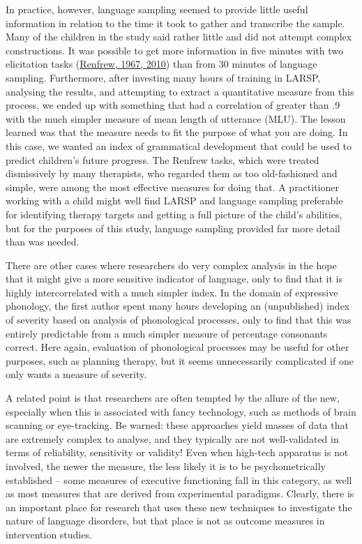 \documentclass{krantz}
\begin{document}
In practice, however, language sampling seemed to provide little useful information in relation to the time it took to gather and transcribe the sample. Many of the children in the study said rather little and did not attempt complex constructions. It was possible to get more information in five minutes with two elicitation tasks (\protect\hyperlink{ref-renfrew1967}{Renfrew, 1967, 2010}) than from 30 minutes of language sampling. Furthermore, after investing many hours of training in LARSP, analysing the results, and attempting to extract a quantitative measure from this process, we ended up with something that had a correlation of greater than .9 with the much simpler measure of mean length of utterance (MLU). The lesson learned was that the measure needs to fit the purpose of what you are doing. In this case, we wanted an index of grammatical development that could be used to predict children's future progress. The Renfrew tasks, which were treated dismissively by many therapists, who regarded them as too old-fashioned and simple, were among the most effective measures for doing that. A practitioner working with a child might well find LARSP and language sampling preferable for identifying therapy targets and getting a full picture of the child's abilities, but for the purposes of this study, language sampling provided far more detail than was needed.

There are other cases where researchers do very complex analysis in the hope that it might give a more sensitive indicator of language, only to find that it is highly intercorrelated with a much simpler index. In the domain of expressive phonology, the first author spent many hours developing an (unpublished) index of severity based on analysis of phonological processes, only to find that this was entirely predictable from a much simpler measure of percentage consonants correct. Here again, evaluation of phonological processes may be useful for other purposes, such as planning therapy, but it seems unnecessarily complicated if one only wants a measure of severity.

A related point is that researchers are often tempted by the allure of the new, especially when this is associated with fancy technology, such as methods of brain scanning or eye-tracking. Be warned: these approaches yield masses of data that are extremely complex to analyse, and they typically are not well-validated in terms of reliability, sensitivity or validity! Even when high-tech apparatus is not involved, the newer the measure, the less likely it is to be psychometrically established -- some measures of executive functioning fall in this category, as well as most measures that are derived from experimental paradigms. Clearly, there is an important place for research that uses these new techniques to investigate the nature of language disorders, but that place is not as outcome measures in intervention studies.
\end{document}
